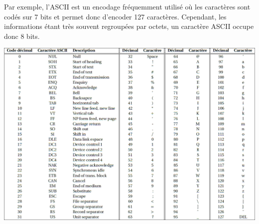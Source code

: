 \documentclass[10pt,fleqn]{article} %
\begin{document}
Par exemple, l'ASCII est un encodage fréquemment utilisé où les caractères sont codés sur 7 bits et permet donc d'encoder 127 caractères. Cependant, les informations étant très souvent regroupées par octets, un caractère ASCII occupe donc 8 bits. 
\begin{center}
\includegraphics[width=\linewidth]{images/ascii}
\end{center}

\newpage
\def\columnseprulecolor{\color{ocre}}
\setlength{\columnseprule}{0.4pt} 
\end{document}
